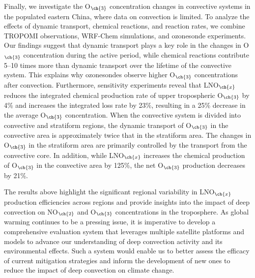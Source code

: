 {Finally, we investigate the O$_{\ch{3}}$ concentration changes in convective systems in the populated eastern China, where data on convection is limited.
To analyze the effects of dynamic transport, chemical reactions, and reaction rates, we combine TROPOMI observations, WRF-Chem simulations, and ozonesonde experiments.
Our findings suggest that dynamic transport plays a key role in the changes in O$_{\ch{3}}$ concentration during the active period,
while chemical reactions contribute 5--10 times more than dynamic transport over the lifetime of the convective system.
This explains why ozonesondes observe higher O$_{\ch{3}}$ concentrations after convection.
Furthermore, sensitivity experiments reveal that LNO$_{\ch{x}}$ reduces the integrated chemical production rate of upper tropospheric O$_{\ch{3}}$ by 4\% and increases the integrated loss rate by 23\%,
resulting in a 25\% decrease in the average O$_{\ch{3}}$ concentration.
When the convective system is divided into convective and stratiform regions,
the dynamic transport of O$_{\ch{3}}$ in the convective area is approximately twice that in the stratiform area.
The changes in O$_{\ch{3}}$ in the stratiform area are primarily controlled by the transport from the convective core.
In addition, while LNO$_{\ch{x}}$ increases the chemical production of O$_{\ch{3}}$ in the convective area by 125\%, the net O$_{\ch{3}}$ production decreases by 21\%.

The results above highlight the significant regional variability in LNO$_{\ch{x}}$ production efficiencies across regions and provide insights into the impact of deep convection on NO$_{\ch{2}}$ and O$_{\ch{3}}$ concentrations in the troposphere.
As global warming continues to be a pressing issue, it is imperative to develop a comprehensive evaluation system that leverages multiple satellite platforms and models to advance our understanding of deep convection activity and its environmental effects.
Such a system would enable us to better assess the efficacy of current mitigation strategies and inform the development of new ones to reduce the impact of deep convection on climate change.
}
